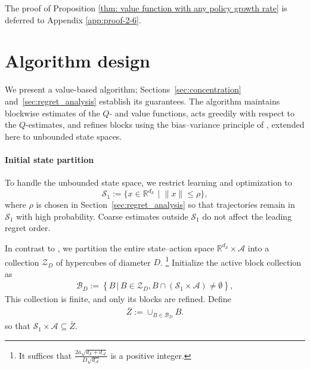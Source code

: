 \documentclass[final,supplement]{siamart251216}
\begin{document}
The proof of Proposition \ref{thm: value function with any policy growth rate} is deferred to Appendix \ref{app:proof-2-6}. 




\section{Algorithm design}\label{sec:algorithm_design}
We present a value-based algorithm; Sections~\ref{sec:concentration}
and~\ref{sec:regret_analysis} establish its guarantees. The algorithm
maintains blockwise estimates of the $Q$- and value functions, acts greedily
with respect to the $Q$-estimates, and refines blocks using the bias--variance
principle of \cite{sinclair2023adaptive}, extended here to unbounded state
spaces.


\paragraph{Initial state partition} To handle the unbounded state space, we restrict learning and optimization to
$$\mathcal{S}_1 :=\Big\{x\in \mathbb{R}^{d_{\mathcal{S}}}\,\,\Big|\,\, \|x\|\leq \rho\Big\},$$ 
where $\rho$ is chosen in Section~\ref{sec:regret_analysis} so that
trajectories remain in $\mathcal S_1$ with high probability. Coarse estimates
outside $\mathcal S_1$ do not affect the leading regret order.

In contrast to \cite{sinclair2023adaptive}, we partition the entire
state--action space $\mathbb R^{d_{\mathcal S}}\times\mathcal A$ into a
collection $\mathcal Z_D$ of hypercubes of diameter $D$. \footnote{It suffices that $\frac{2\bar{a}\sqrt{d_{\mathcal{S}}+d_{\mathcal{A}}}}{D\sqrt{d_{\mathcal{A}}}}$ is a positive integer.}
Initialize the active block collection as
   \begin{eqnarray*}
    \mathcal{B}_{D}:=\left\{B \,\Big|\,B \in \mathcal{Z}_{D}, B\cap (\mathcal{S}_{1}\times \mathcal{A})\neq \emptyset\right\},
\end{eqnarray*}
This collection is finite, and only its blocks are refined. Define
\begin{eqnarray}
    \bar{Z}:=\cup_{B\in \mathcal{B}_{D}} B. \label{eq:partition_space}
\end{eqnarray}
so that $\mathcal S_1\times\mathcal A\subseteq\bar Z$.
\end{document}
